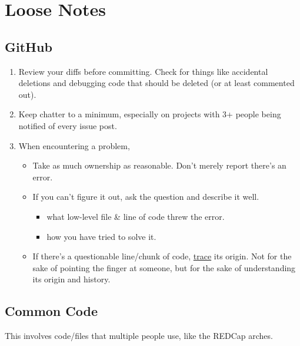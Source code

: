 \documentclass[
]{book}
\providecommand{\tightlist}{%
  \setlength{\itemsep}{0pt}\setlength{\parskip}{0pt}}
\begin{document}
\hypertarget{loose-notes}{%
\section{Loose Notes}\label{loose-notes}}

\hypertarget{github}{%
\subsection{GitHub}\label{github}}

\begin{enumerate}
\def\labelenumi{\arabic{enumi}.}
\item
  Review your diffs before committing. Check for things like accidental deletions and debugging code that should be deleted (or at least commented out).
\item
  Keep chatter to a minimum, especially on projects with 3+ people being notified of every issue post.
\item
  When encountering a problem,

  \begin{itemize}
  \tightlist
  \item
    Take as much ownership as reasonable. Don't merely report there's an error.\\
  \item
    If you can't figure it out, ask the question and describe it well.

    \begin{itemize}
    \tightlist
    \item
      what low-level file \& line of code threw the error.
    \item
      how you have tried to solve it.
    \end{itemize}
  \item
    If there's a questionable line/chunk of code, \href{https://help.github.com/articles/tracing-changes-in-a-file/}{trace} its origin. Not for the sake of pointing the finger at someone, but for the sake of understanding its origin and history.
  \end{itemize}
\end{enumerate}

\hypertarget{common-code}{%
\subsection{Common Code}\label{common-code}}

This involves code/files that multiple people use, like the REDCap arches.
\end{document}
